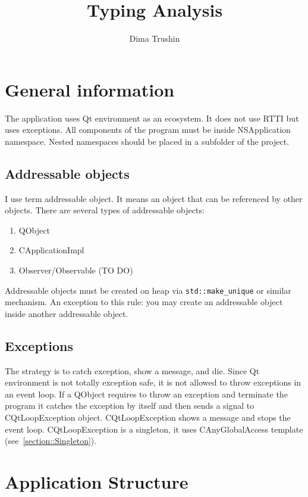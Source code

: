 \documentclass{article}
\begin{document}
\title{Typing Analysis}
\author{Dima Trushin}
\date{}
	
\maketitle
\tableofcontents

\section{General information}

The application uses Qt environment as an ecosystem. It does not use RTTI but uses exceptions. All components of the program must be inside NSApplication namespace. Nested namespaces should be placed in a subfolder of the project.

\subsection{Addressable objects}

I use term addressable object. It means an object that can be referenced by other objects. There are several types of addressable objects:
\begin{enumerate}
\item QObject
\item CApplicationImpl
\item Observer/Observable (TO DO)
\end{enumerate}
Addressable objects must be created on heap via \verb"std::make_unique" or similar mechanism. An exception to this rule: you may create an addressable object inside another addressable object.

\subsection{Exceptions}

The strategy is to catch exception, show a message, and die. Since Qt environment is not totally exception safe, it is not allowed to throw exceptions in an event loop. If a QObject requires to throw an exception and terminate the program it catches the exception by itself and then sends a signal to CQtLoopException object. CQtLoopException shows a message and stops the event loop. CQtLoopException is a singleton, it uses CAnyGlobalAccess template (see~\ref{section::Singleton}).

\section{Application Structure}
\end{document}
